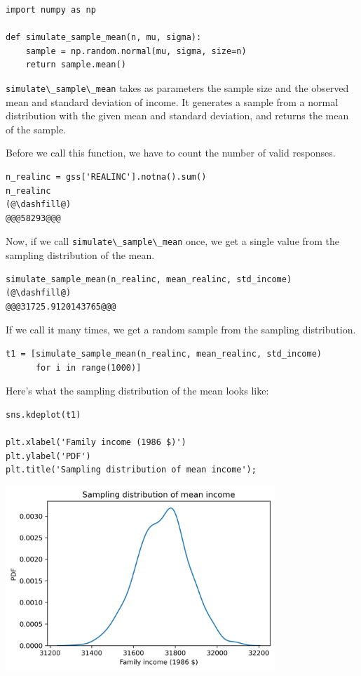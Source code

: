 \begin{lstlisting}[]
import numpy as np

def simulate_sample_mean(n, mu, sigma):
    sample = np.random.normal(mu, sigma, size=n)
    return sample.mean()
\end{lstlisting}

\passthrough{\lstinline!simulate\_sample\_mean!} takes as parameters the
sample size and the observed mean and standard deviation of income. It
generates a sample from a normal distribution with the given mean and
standard deviation, and returns the mean of the sample.

Before we call this function, we have to count the number of valid
responses.

\begin{lstlisting}[]
n_realinc = gss['REALINC'].notna().sum()
n_realinc
(@\dashfill@)
@@@58293@@@
\end{lstlisting}

Now, if we call \passthrough{\lstinline!simulate\_sample\_mean!} once,
we get a single value from the sampling distribution of the mean.

\begin{lstlisting}[]
simulate_sample_mean(n_realinc, mean_realinc, std_income)
(@\dashfill@)
@@@31725.9120143765@@@
\end{lstlisting}

If we call it many times, we get a random sample from the sampling
distribution.

\begin{lstlisting}[]
t1 = [simulate_sample_mean(n_realinc, mean_realinc, std_income)
      for i in range(1000)]
\end{lstlisting}

Here's what the sampling distribution of the mean looks like:

\begin{lstlisting}[]
sns.kdeplot(t1)

plt.xlabel('Family income (1986 $)')
plt.ylabel('PDF')
plt.title('Sampling distribution of mean income');
\end{lstlisting}

\begin{center}
\includegraphics[width=4in]{chapters/12_bootstrap_files/12_bootstrap_23_0.png}
\end{center}

